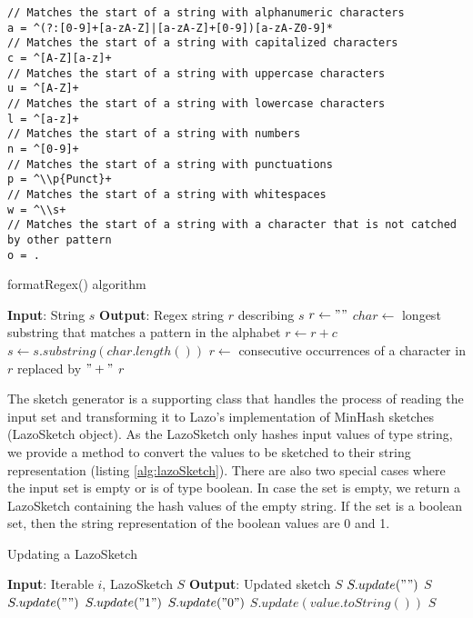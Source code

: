 \begin{itemize}
    \begin{lstlisting}[caption=Alphabet of the regex, numbers=none, label=lst:patterns]
// Matches the start of a string with alphanumeric characters
a = ^(?:[0-9]+[a-zA-Z]|[a-zA-Z]+[0-9])[a-zA-Z0-9]*
// Matches the start of a string with capitalized characters
c = ^[A-Z][a-z]+
// Matches the start of a string with uppercase characters
u = ^[A-Z]+
// Matches the start of a string with lowercase characters
l = ^[a-z]+
// Matches the start of a string with numbers
n = ^[0-9]+
// Matches the start of a string with punctuations
p = ^\\p{Punct}+
// Matches the start of a string with whitespaces
w = ^\\s+
// Matches the start of a string with a character that is not catched by other pattern
o = .
    \end{lstlisting}

    \begin{algorithm}
    \caption{formatRegex() algorithm}
    \label{alg:formatRegex}
        \begin{algorithmic}[1]
\STATE \textbf{Input}: String $s$
\STATE \textbf{Output}: Regex string $r$ describing $s$
\STATE $r \gets ""$
\STATE $char \gets$ longest substring that matches a pattern in the alphabet
\STATE $r \gets r + c$
\STATE $s \gets s.substring(char.length())$
\ENDWHILE
\STATE $r \gets $ consecutive occurrences of a character in $r$ replaced by $"+"$
\RETURN $r$
            
        \end{algorithmic}
    \end{algorithm}
    
\end{itemize}

The sketch generator is a supporting class that handles the process of reading the input set and transforming it to Lazo's implementation of MinHash sketches (LazoSketch object). As the LazoSketch only hashes input values of type string, we provide a method to convert the values to be sketched to their string representation (listing \ref{alg:lazoSketch}). There are also two special cases where the input set is empty or is of type boolean. In case the set is empty, we return a LazoSketch containing the hash values of the empty string. If the set is a boolean set, then the string representation of the boolean values are 0 and 1.

\begin{algorithm}
    \caption{Updating a LazoSketch}
    \label{alg:lazoSketch}
    \begin{algorithmic}[1]
\STATE \textbf{Input}: Iterable $i$, LazoSketch $S$
\STATE \textbf{Output}: Updated sketch $S$
\STATE $S.update("")$
\RETURN $S$
\ENDIF
{}
\STATE $S.update("")$
\STATE $S.update("1")$
\ELSE
\STATE $S.update("0")$
\ENDIF
\ELSE
\STATE $S.update(value.toString())$
\ENDIF
\ENDFOR
\RETURN $S$
    \end{algorithmic}
\end{algorithm}

